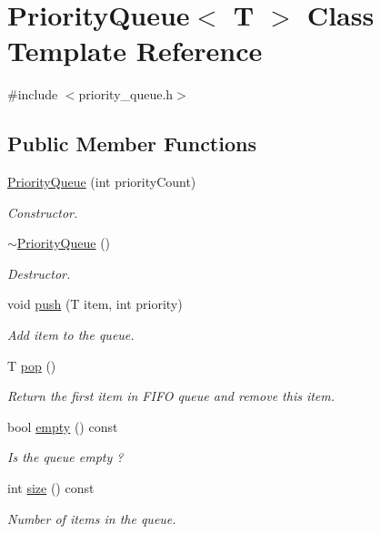 \hypertarget{class_priority_queue}{
\section{PriorityQueue$<$ T $>$ Class Template Reference}
\label{class_priority_queue}
}


{\ttfamily \#include $<$priority\_\-queue.h$>$}

\subsection*{Public Member Functions}
\begin{DoxyCompactItemize}
\item 
\hyperlink{class_priority_queue_a26657301dcdb58a2b98c52868f4eff85}{PriorityQueue} (int priorityCount)
\begin{DoxyCompactList}\small\item\em Constructor. \item\end{DoxyCompactList}\item 
\hyperlink{class_priority_queue_a69038745381e57fe65b3a5da985a5506}{$\sim$PriorityQueue} ()
\begin{DoxyCompactList}\small\item\em Destructor. \item\end{DoxyCompactList}\item 
void \hyperlink{class_priority_queue_a88c0b212c85e6e500d6213a6ee0b6463}{push} (T item, int priority)
\begin{DoxyCompactList}\small\item\em Add item to the queue. \item\end{DoxyCompactList}\item 
T \hyperlink{class_priority_queue_a38deb7818722ba5bdf328541c0f669e8}{pop} ()
\begin{DoxyCompactList}\small\item\em Return the first item in FIFO queue and remove this item. \item\end{DoxyCompactList}\item 
bool \hyperlink{class_priority_queue_a495abe086dd248059e4325cdf08e1bb1}{empty} () const 
\begin{DoxyCompactList}\small\item\em Is the queue empty ? \item\end{DoxyCompactList}\item 
int \hyperlink{class_priority_queue_a78870582a8eeb9ec8fe33e9fe72780de}{size} () const 
\begin{DoxyCompactList}\small\item\em Number of items in the queue. \item\end{DoxyCompactList}\end{DoxyCompactItemize}


